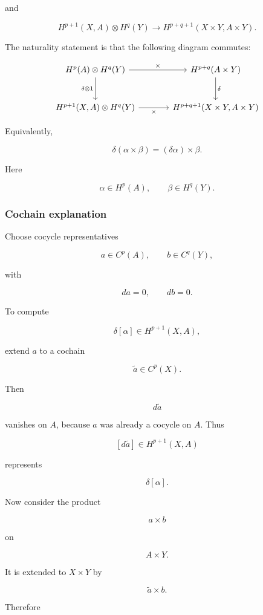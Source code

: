 \documentclass[12pt,a4paper]{article}
\theoremstyle{notespace}
\begin{document}
and

\[
H^{p+1}(X,A)\otimes H^q(Y)
\longrightarrow
H^{p+q+1}(X\times Y,A\times Y).
\]

The naturality statement is that the following diagram commutes:

\[
\begin{tikzcd}[column sep=large,row sep=large]
	H^p(A)\otimes H^q(Y)
	\arrow[r,"\times"]
	\arrow[d,"\delta\otimes 1"']
	&
	H^{p+q}(A\times Y)
	\arrow[d,"\delta"]
	\\
	H^{p+1}(X,A)\otimes H^q(Y)
	\arrow[r,"\times"']
	&
	H^{p+q+1}(X\times Y,A\times Y)
\end{tikzcd}
\]

Equivalently,

\[
\boxed{
	\delta(\alpha\times\beta)
	=
	(\delta\alpha)\times\beta.
}
\]

Here

\[
\alpha\in H^p(A),
\qquad
\beta\in H^q(Y).
\]

\subsubsection*{Cochain explanation}

Choose cocycle representatives

\[
a\in C^p(A),
\qquad
b\in C^q(Y),
\]

with

\[
da=0,
\qquad
db=0.
\]

To compute

\[
\delta[\alpha]\in H^{p+1}(X,A),
\]

extend \(a\) to a cochain

\[
\widetilde a\in C^p(X).
\]

Then

\[
d\widetilde a
\]

vanishes on \(A\), because \(a\) was already a cocycle on \(A\). Thus

\[
[d\widetilde a]\in H^{p+1}(X,A)
\]

represents

\[
\delta[\alpha].
\]

Now consider the product

\[
a\times b
\]

on

\[
A\times Y.
\]

It is extended to \(X\times Y\) by

\[
\widetilde a\times b.
\]

Therefore
\end{document}
